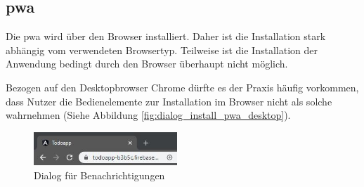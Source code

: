 \subsection{\ac{pwa}}
Die \ac{pwa} wird über den Browser installiert. Daher ist die Installation stark abhängig vom verwendeten Browsertyp. Teilweise ist die Installation der Anwendung bedingt durch den Browser überhaupt nicht möglich.

Bezogen auf den Desktopbrowser Chrome dürfte es der Praxis häufig vorkommen, dass Nutzer die Bedienelemente zur Installation im Browser nicht als solche wahrnehmen (Siehe Abbildung \ref{fig:dialog_install_pwa_desktop}).



\begin{figure}
	\vspace{-10pt}
	\includegraphics[width=0.48\textwidth]{img/add_pwa_to_desktop.jpg}
	\centering
	\caption{Dialog für Benachrichtigungen}
	\label{fig:pwa_benachrichtigungen_zulassen}
	\vspace{-10pt}
\end{figure}